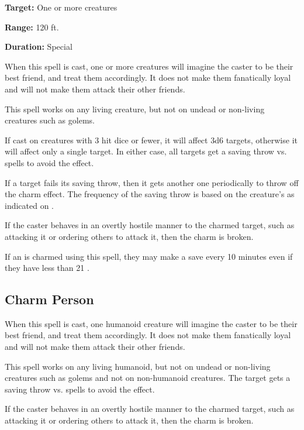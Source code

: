 \begin{multicols*}{2}
{\textbf{Target:} One or more creatures

\textbf{Range:} 120 ft.

\textbf{Duration:} Special}

When this spell is cast, one or more creatures will imagine the caster to be their best friend, and treat them accordingly. It does not make them fanatically loyal and will not make them attack their other friends.

This spell works on any living creature, but not on undead or non-living creatures such as golems.

If cast on creatures with 3 hit dice or fewer, it will affect 3d6 targets, otherwise it will affect only a single target. In either case, all targets get a saving throw vs. spells to avoid the effect.

If a target fails its saving throw, then it gets another one periodically to throw off the charm effect. The frequency of the saving throw is based on the creature’s  as indicated on .

If the caster behaves in an overtly hostile manner to the charmed target, such as attacking it or ordering others to attack it, then the charm is broken.

If an  is charmed using this spell, they may make a save every 10 minutes even if they have less than 21 .

\subsection{Charm Person}\label{spell:Charm Person}

When this spell is cast, one humanoid creature will imagine the caster to be their best friend, and treat them accordingly. It does not make them fanatically loyal and will not make them attack their other friends.

This spell works on any living humanoid, but not on undead or non-living creatures such as golems and not on non-humanoid creatures. The target gets a saving throw vs. spells to avoid the effect.

If the caster behaves in an overtly hostile manner to the charmed target, such as attacking it or ordering others to attack it, then the charm is broken.


\end{multicols*}
